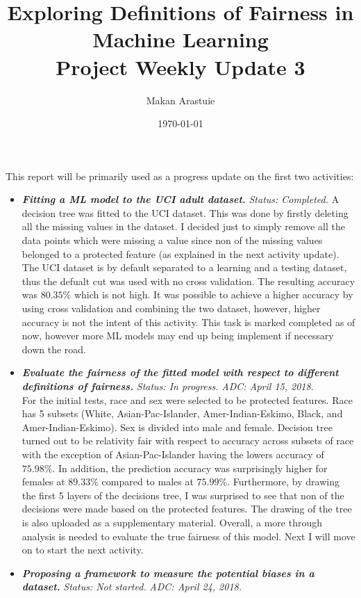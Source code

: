 \documentclass[11pt]{article}
\begin{document}
\title{%
  Exploring Definitions of Fairness in Machine Learning \\ \vspace{5mm}
  \large Project Weekly Update 3}
\author{Makan Arastuie}
\date{\today}
\maketitle


This report will be primarily used as a progress update on the first two activities:

\begin{itemize}

\item \textbf{\textit{Fitting a ML model to the UCI adult dataset.}} \textit{Status: Completed.}
A decision tree was fitted to the UCI dataset. This was done by firstly deleting all the missing values in the dataset. I decided just to simply remove all the data points which were missing a value since non of the missing values belonged to a protected feature (as explained in the next activity update). The UCI dataset is by default separated to a learning and a testing dataset, thus the defualt cut was used with no cross validation. The resulting accuracy was $80.35\%$ which is not high. It was possible to achieve a higher accuracy by using cross validation and combining the two dataset, however, higher accuracy is not the intent of this activity. This task is marked completed as of now, however more ML models may end up being implement if necessary down the road.

\item \textbf{\textit{Evaluate the fairness of the fitted model with respect to different definitions of fairness.}} \textit{Status: In progress.} \textit{ADC: April 15, 2018.} \\
For the initial tests, race and sex were selected to be protected features. Race has 5 subsets (White, Asian-Pac-Islander, Amer-Indian-Eskimo, Black, and Amer-Indian-Eskimo). Sex is divided into male and female. Decision tree turned out to be relativity fair with respect to accuracy across subsets of race with the exception of Asian-Pac-Islander having the lowers accuracy of $75.98\%$. In addition, the prediction accuracy was surprisingly higher for females at $89.33\%$ compared to males at $75.99\%$. Furthermore, by drawing the first 5 layers of the decisions tree, I was surprised to see that non of the decisions were made based on the protected features. The drawing of the tree is also uploaded as a supplementary material.
Overall, a more through analysis is needed to evaluate the true fairness of this model. Next I will move on to start the next activity.

\item \textbf{\textit{Proposing a framework to measure the potential biases in a dataset.}} \textit{Status: Not started.} \textit{ADC: April 24, 2018.} \\

\end{itemize} 
\end{document}
